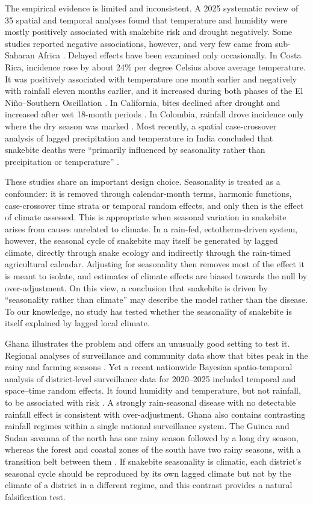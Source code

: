 \documentclass[11pt,a4paper]{article}
\begin{document}
The empirical evidence is limited and inconsistent. A 2025 systematic review of 35 spatial and temporal analyses found that temperature and humidity were mostly positively associated with snakebite risk and drought negatively. Some studies reported negative associations, however, and very few came from sub-Saharan Africa \cite{ref8}. Delayed effects have been examined only occasionally. In Costa Rica, incidence rose by about 24\% per degree Celsius above average temperature. It was positively associated with temperature one month earlier and negatively with rainfall eleven months earlier, and it increased during both phases of the El Niño--Southern Oscillation \cite{ref9}. In California, bites declined after drought and increased after wet 18-month periods \cite{ref10}. In Colombia, rainfall drove incidence only where the dry season was marked \cite{ref11}. Most recently, a spatial case-crossover analysis of lagged precipitation and temperature in India concluded that snakebite deaths were ``primarily influenced by seasonality rather than precipitation or temperature'' \cite{ref12}.

These studies share an important design choice. Seasonality is treated as a confounder: it is removed through calendar-month terms, harmonic functions, case-crossover time strata or temporal random effects, and only then is the effect of climate assessed. This is appropriate when seasonal variation in snakebite arises from causes unrelated to climate. In a rain-fed, ectotherm-driven system, however, the seasonal cycle of snakebite may itself be generated by lagged climate, directly through snake ecology and indirectly through the rain-timed agricultural calendar. Adjusting for seasonality then removes most of the effect it is meant to isolate, and estimates of climate effects are biased towards the null by over-adjustment. On this view, a conclusion that snakebite is driven by ``seasonality rather than climate'' may describe the model rather than the disease. To our knowledge, no study has tested whether the seasonality of snakebite is itself explained by lagged local climate.

Ghana illustrates the problem and offers an unusually good setting to test it. Regional analyses of surveillance and community data show that bites peak in the rainy and farming seasons \cite{ref4,ref6}. Yet a recent nationwide Bayesian spatio-temporal analysis of district-level surveillance data for 2020--2025 included temporal and space--time random effects. It found humidity and temperature, but not rainfall, to be associated with risk \cite{ref13}. A strongly rain-seasonal disease with no detectable rainfall effect is consistent with over-adjustment. Ghana also contains contrasting rainfall regimes within a single national surveillance system. The Guinea and Sudan savanna of the north has one rainy season followed by a long dry season, whereas the forest and coastal zones of the south have two rainy seasons, with a transition belt between them \cite{ref14}. If snakebite seasonality is climatic, each district's seasonal cycle should be reproduced by its own lagged climate but not by the climate of a district in a different regime, and this contrast provides a natural falsification test.
\end{document}
